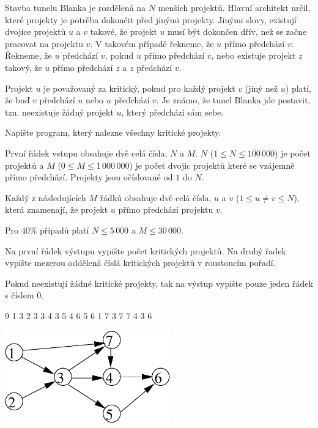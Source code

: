 





Stavba tunelu Blanka je rozdělená na $N$ menších projektů.
Hlavní architekt určil, které projekty je potrěba dokončit před jinými projekty.
Jinými slovy, existují dvojice projektů $u$ a $v$ takové, že projekt $u$ musí být dokončen dřív, než se začne pracovat na projektu $v$.
V takovém případě řekneme, že $u$ přímo předchází $v$.
Řekneme, že $u$ předchází $v$, pokud $u$ přímo předchází $v$, nebo existuje projekt $z$ takový, že $u$ přímo předchází $z$ a $z$ předchází $v$.

Projekt $u$ je považovaný za kritický, pokud pro každý projekt $v$ (jiný než $u$) platí, že buď $v$ předchází $u$ nebo $u$ předchází $v$.
Je známo, že tunel Blanka jde postavit, tzn. neexistuje žádný projekt $u$, který předchází sám sebe.


Napište program, který nalezne všechny kritické projekty.


První řádek vstupu obsahuje dvě celá čísla, $N$ a $M$.
$N$ ($1 \leq N \leq 100\,000$) je počet projektů a $M$ ($0 \leq M \leq 1\,000\,000$) je počet dvojic projektů které se vzájemně přímo předchází.
Projekty jsou očíslované od $1$ do $N$.

Každý z následujících $M$ řádků obsahuje dvě celá čísla, $u$ a $v$ ($1 \leq u \neq v \leq N$), která znamenají, že projekt $u$ přímo předchází projektu $v$.

\smallskip
Pro $40 \%$ případů platí $N \leq 5\,000$ a $M \leq 30\,000$.


Na první řádek výstupu vypište počet kritických projektů. Na druhý řadek vypište mezerou oddělená číslá kritických projektů v roustoucím pořadí.

Pokud neexistují žádné kritické projekty, tak na výstup vypište pouze jeden řádek s číslem 0.


 9
1 3
2 3
3 4
3 5
4 6
5 6
1 7
3 7
7 4
3 6
\sampleCOMMENT

\sampleEND

\includegraphics[height=4cm]{img/critical-fig.pdf}
\bigskip



